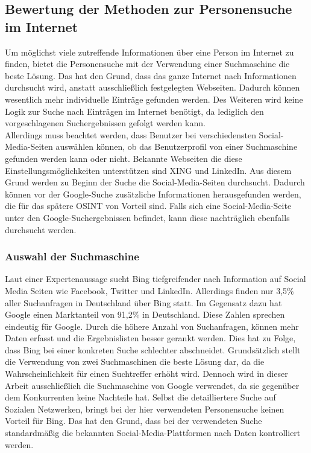 		\subsection{Bewertung der Methoden zur Personensuche im Internet}
		Um möglichst viele zutreffende Informationen über eine Person im Internet zu finden, bietet die Personensuche mit der Verwendung einer Suchmaschine die beste Lösung. Das hat den Grund, dass das ganze Internet nach Informationen durchsucht wird, anstatt ausschließlich festgelegten Webseiten. Dadurch können wesentlich mehr individuelle Einträge gefunden werden. Des Weiteren wird keine Logik zur Suche nach Einträgen im Internet benötigt, da lediglich den vorgeschlagenen Suchergebnissen gefolgt werden kann.\\
		Allerdings muss beachtet werden, dass Benutzer bei verschiedensten Social-Media-Seiten auswählen können, ob das Benutzerprofil von einer Suchmaschine gefunden werden kann oder nicht. Bekannte Webseiten die diese Einstellungsmöglichkeiten unterstützen sind XING und LinkedIn. Aus diesem Grund werden zu Beginn der Suche die Social-Media-Seiten durchsucht. Dadurch können vor der Google-Suche zusätzliche Informationen herausgefunden werden, die für das spätere OSINT von Vorteil sind. Falls sich eine Social-Media-Seite unter den Google-Suchergebnissen befindet, kann diese nachträglich ebenfalls durchsucht werden.
		
			\subsubsection{Auswahl der Suchmaschine}
			Laut einer Expertenaussage sucht Bing tiefgreifender nach Information auf Social Media Seiten wie Facebook, Twitter und LinkedIn. Allerdings finden nur 3,5\% aller Suchanfragen in Deutschland über Bing statt. Im Gegensatz dazu hat Google einen Marktanteil von 91,2\% in Deutschland. Diese Zahlen sprechen eindeutig für Google. Durch die höhere Anzahl von Suchanfragen, können mehr Daten erfasst und die Ergebnislisten besser gerankt werden. Dies hat zu Folge, dass Bing bei einer konkreten Suche schlechter abschneidet. \cite{Suchmaschinen}
			Grundsätzlich stellt die Verwendung von zwei Suchmaschinen die beste Lösung dar, da die Wahrscheinlichkeit für einen Suchtreffer erhöht wird. Dennoch wird in dieser Arbeit ausschließlich die Suchmaschine von Google verwendet, da sie gegenüber dem Konkurrenten keine Nachteile hat. Selbst die detailliertere Suche auf Sozialen Netzwerken, bringt bei der hier verwendeten Personensuche keinen Vorteil für Bing. Das hat den Grund, dass bei der verwendeten Suche standardmäßig die bekannten Social-Media-Plattformen nach Daten kontrolliert werden. 
		 	
